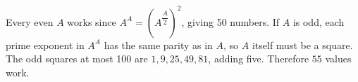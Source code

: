 Every even $A$ works since $A^A=(A^{\dfrac{A}{2}})^2$, giving 50 numbers. If $A$ is odd, each prime exponent in $A^A$ has the same parity as in $A$, so $A$ itself must be a square. The odd squares at most 100 are $1,9,25,49,81$, adding five. Therefore $\boxed{55}$ values work.
